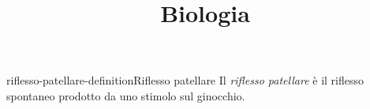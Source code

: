\documentclass[preview]{standalone}
\begin{document}
\title{Biologia}
\genpage

\begin{snippetdefinition}{riflesso-patellare-definition}{Riflesso patellare}
    Il \textit{riflesso patellare} è il riflesso spontaneo prodotto
    da uno stimolo sul ginocchio.
\end{snippetdefinition}

\end{document}
